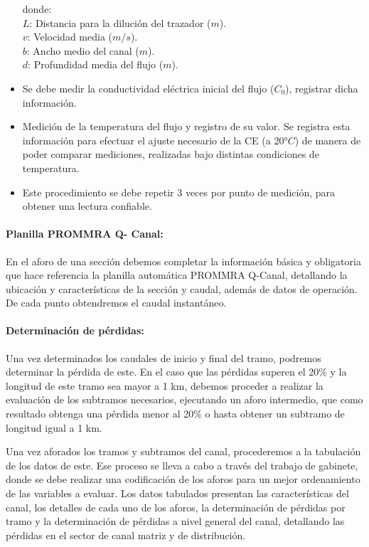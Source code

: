 \documentclass[]{article}
\begin{document}
\begin{itemize}
donde:\\
\(L\): Distancia para la dilución del trazador ($m$).\\
\(v\): Velocidad media ($m/s$).\\
\(b\): Ancho medio del canal ($m$).\\
\(d\): Profundidad media del flujo ($m$).\\
\item Se debe medir la conductividad eléctrica inicial del flujo ($C_0$), registrar dicha información.
\item Medición de la temperatura del flujo y registro de su valor. Se registra esta información para efectuar el ajuste necesario de la CE (a 20°$C$) de manera de poder comparar mediciones, realizadas bajo distintas condiciones de temperatura.
\item Este procedimiento se debe repetir 3 veces por punto de medición, para obtener una lectura confiable.
\end{itemize}

\paragraph{Planilla PROMMRA Q- Canal:}

En el aforo de una sección debemos completar la información básica y obligatoria que hace referencia la planilla automática PROMMRA Q-Canal, detallando la ubicación y características de la sección y caudal, además de datos de operación. De cada punto obtendremos el caudal instantáneo.

\paragraph{Determinación de pérdidas:}

Una vez determinados los caudales de inicio y final del tramo, podremos determinar la pérdida de este. En el caso que las pérdidas superen el 20\% y la longitud de este tramo sea mayor a 1 km, debemos proceder a realizar la evaluación de los subtramos necesarios, ejecutando un aforo intermedio, que como resultado obtenga una pérdida menor al 20\% o hasta obtener un subtramo de longitud igual a 1 km.

Una vez aforados los tramos y subtramos del canal, procederemos a la tabulación de los datos de este. Ese proceso se lleva a cabo a través del trabajo de gabinete, donde se debe realizar una codificación de los aforos para un mejor ordenamiento de las variables a evaluar. Los datos tabulados presentan las características del canal, los detalles de cada uno de los aforos, la determinación de pérdidas por tramo y la determinación de pérdidas a nivel general del canal, detallando las pérdidas en el sector de canal matriz y de distribución.
\end{document}
